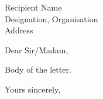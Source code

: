 \documentclass[sign=0,closing=left]{saus-letter}
\begin{document}
\begin{letter}{%
  Recipient Name\\
  Designation, Organisation\\
  Address}

\opening{Dear Sir/Madam,}

Body of the letter.

\closing{Yours sincerely,}

\end{letter}

\end{document}
